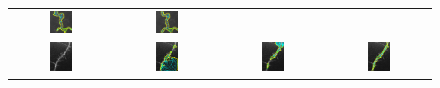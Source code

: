 \begin{figure}[t]
\begin{tabular}{@{}cccc@{}}
\includegraphics[width=0.24\textwidth]{images/L2S_compare/CV_4}		&
\includegraphics[width=0.24\textwidth]{images/L2S_compare/L2S_4}	
\\
\includegraphics[width=0.24\textwidth]{images/L2S_compare/orig_5}	&
\includegraphics[width=0.24\textwidth]{images/L2S_compare/GAC_5}	&
\includegraphics[width=0.24\textwidth]{images/L2S_compare/CV_5}		&
\includegraphics[width=0.24\textwidth]{images/L2S_compare/L2S_5}	\\

\end{tabular}
\end{figure}
